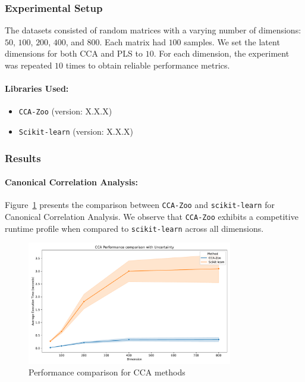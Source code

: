 \subsubsection{Experimental Setup}
The datasets consisted of random matrices with a varying number of dimensions: \(50\), \(100\), \(200\), \(400\), and \(800\). Each matrix had \(100\) samples. We set the latent dimensions for both CCA and PLS to \(10\). For each dimension, the experiment was repeated \(10\) times to obtain reliable performance metrics.

\paragraph{Libraries Used:}
\begin{itemize}
    \item \texttt{CCA-Zoo} (version: X.X.X)
    \item \texttt{Scikit-learn} (version: X.X.X)
\end{itemize}

\subsubsection{Results}

\paragraph{Canonical Correlation Analysis:}
Figure~\ref{fig:cca_benchmark} presents the comparison between \texttt{CCA-Zoo} and \texttt{scikit-learn} for Canonical Correlation Analysis. We observe that \texttt{CCA-Zoo} exhibits a competitive runtime profile when compared to \texttt{scikit-learn} across all dimensions.

\begin{figure}[h]
    \centering
    \includegraphics[width=0.8\textwidth]{figures/CCA_Speed_Benchmark}
    \caption{Performance comparison for CCA methods}
    \label{fig:cca_benchmark}
\end{figure}

